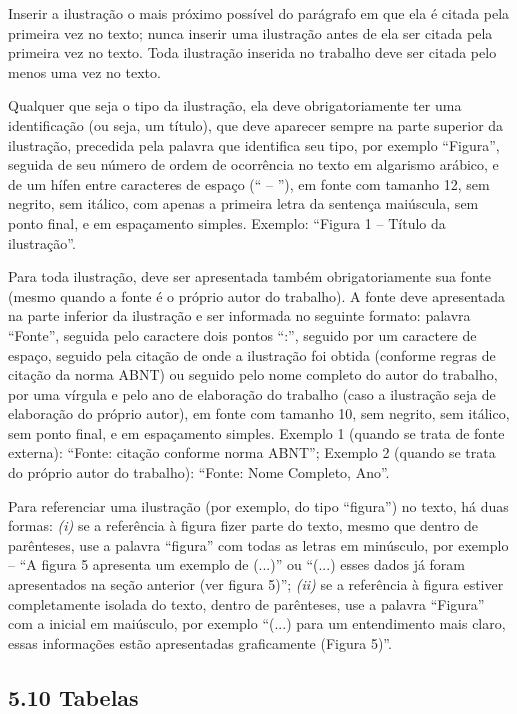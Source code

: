 \documentclass[
	12pt,				%
	oneside,			%
	a4paper,			%
	english,			%
	brazil				%
	]{abntex2ppgsi}
\begin{document}
\begin{anexosenv}
Inserir a ilustração o mais próximo possível do parágrafo em que ela é citada pela primeira vez no texto; nunca inserir uma ilustração antes de ela ser citada pela primeira vez no texto. Toda ilustração inserida no trabalho deve ser citada pelo menos uma vez no texto.

Qualquer que seja o tipo da ilustração, ela deve obrigatoriamente ter uma identificação (ou seja, um título), que deve aparecer sempre na parte superior da ilustração, precedida pela palavra que identifica seu tipo, por exemplo ``Figura'', seguida de seu número de ordem de ocorrência no texto em algarismo arábico, e de um hífen entre caracteres de espaço (`` – ''), em fonte com tamanho 12, sem negrito, sem itálico, com apenas a primeira letra da sentença maiúscula, sem ponto final, e em espaçamento simples. Exemplo: ``Figura 1 – Título da ilustração''.

Para toda ilustração, deve ser apresentada também obrigatoriamente sua fonte (mesmo quando a fonte é o próprio autor do trabalho). A fonte deve apresentada na parte inferior da ilustração e ser informada no seguinte formato: palavra ``Fonte'', seguida pelo caractere dois pontos ``:'', seguido por um caractere de espaço, seguido pela citação de onde a ilustração foi obtida (conforme regras de citação da norma ABNT) ou seguido pelo nome completo do autor do trabalho, por uma vírgula e pelo ano de elaboração do trabalho (caso a ilustração seja de elaboração do próprio autor), em fonte com tamanho 10, sem negrito, sem itálico, sem ponto final, e em espaçamento simples. Exemplo 1 (quando se trata de fonte externa): ``Fonte: citação conforme norma ABNT''; Exemplo 2 (quando se trata do próprio autor do trabalho): ``Fonte: Nome Completo, Ano''.

Para referenciar uma ilustração (por exemplo, do tipo ``figura'') no texto, há duas formas: \textit{(i)} se a referência à figura fizer parte do texto, mesmo que dentro de parênteses, use a palavra ``figura'' com todas as letras em minúsculo, por exemplo – ``A figura 5 apresenta um exemplo de (...)'' ou ``(...) esses dados já foram apresentados na seção anterior (ver figura 5)''; \textit{(ii)} se a referência à figura estiver completamente isolada do texto, dentro de parênteses, use a palavra ``Figura'' com a inicial em maiúsculo, por exemplo ``(...) para um entendimento mais claro, essas informações estão apresentadas graficamente (Figura 5)''.

\subsection*{5.10 Tabelas}


\end{anexosenv}
\end{document}
